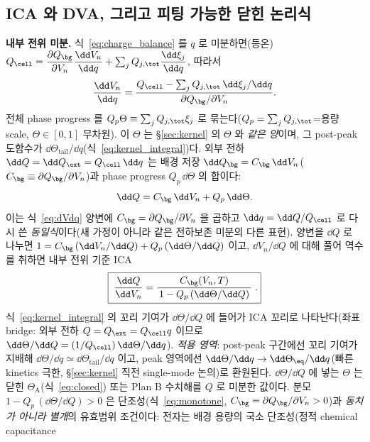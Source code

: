 \subsection{ICA 와 DVA, 그리고 피팅 가능한 닫힌 논리식}\label{sec:fiteq}
\textbf{내부 전위 미분.} 식~\eqref{eq:charge_balance} 를 $q$ 로 미분하면(등온)
$Q_\cell=\dfrac{\partial Q_\bg}{\partial V_n}\dfrac{\dd V_n}{\dd q}+\sum_j Q_{j,\tot}\dfrac{\dd\xi_j}{\dd q}$,
따라서
\begin{equation}
\frac{\dd V_n}{\dd q}=\frac{Q_\cell-\sum_j Q_{j,\tot}\,\dd\xi_j/\dd q}{\partial Q_\bg/\partial V_n}.
\label{eq:dVdq}
\end{equation}
전체 phase progress 를 $Q_p\Theta\equiv\sum_j Q_{j,\tot}\xi_j$ 로 묶는다($Q_p=\sum_j Q_{j,\tot}$=용량 scale,
$\Theta\in[0,1]$ 무차원). 이 $\Theta$ 는 \S\ref{sec:kernel} 의 $\Theta$ 와 \emph{같은 양}이며, 그 post-peak
도함수가 $\dd\Theta_\mathrm{tail}/\dd q$(식~\eqref{eq:kernel_integral})다. 외부 전하 $\dd Q=\dd Q_\ext=
Q_\cell\,\dd q$ 는 배경 저장 $\dd Q_\bg=C_\bg\,\dd V_n$($C_\bg\equiv\partial Q_\bg/\partial V_n$)과
phase progress $Q_p\,\dd\Theta$ 의 합이다:
\begin{equation}
\dd Q=C_\bg\,\dd V_n+Q_p\,\dd\Theta.
\label{eq:dQsplit}
\end{equation}
이는 식~\eqref{eq:dVdq} 양변에 $C_\bg=\partial Q_\bg/\partial V_n$ 을 곱하고 $\dd q=\dd Q/Q_\cell$ 로 다시 쓴
\emph{동일식}이다(새 가정이 아니라 같은 전하보존 미분의 다른 표현). 양변을 $\dd Q$ 로 나누면 $1=C_\bg\,(\dd V_n/\dd Q)+Q_p\,(\dd\Theta/\dd Q)$ 이고, $\dd V_n/\dd Q$ 에 대해 풀어
역수를 취하면 내부 전위 기준 ICA
\begin{equation}
\boxed{\;\frac{\dd Q}{\dd V_n}=\frac{C_\bg(V_n,T)}{\,1-Q_p\,(\dd\Theta/\dd Q)\,}\;.}
\label{eq:fiteq}
\end{equation}
식~\eqref{eq:kernel_integral} 의 꼬리 기여가 $\dd\Theta/\dd Q$ 에 들어가 ICA 꼬리로 나타난다(좌표 bridge:
외부 전하 $Q=Q_\ext=Q_\cell q$ 이므로 $\dd\Theta/\dd Q=(1/Q_\cell)\,\dd\Theta/\dd q$). \emph{적용 영역}: post-peak
구간에선 꼬리 기여가 지배해 $\dd\Theta/\dd q\simeq\dd\Theta_\mathrm{tail}/\dd q$ 이고, peak 영역에선
$\dd\Theta/\dd q\to\dd\Theta_\eq/\dd q$(빠른 kinetics 극한, \S\ref{sec:kernel} 직전 single-mode 논의)로 환원된다.
$\dd\Theta/\dd Q$ 에 넣는 $\Theta$ 는 닫힌 $\Theta_\mathrm A$(식~\eqref{eq:closed}) 또는 Plan B 수치해를 $Q$ 로
미분한 값이다. 분모
$1-Q_p\,(\dd\Theta/\dd Q)>0$ 은 단조성(식~\eqref{eq:monotone}, $C_\bg=\partial Q_\bg/\partial V_n>0$)과
\emph{동치가 아니라 별개}의 유효범위 조건이다: 전자는 배경 용량의 국소 단조성(정적 chemical capacitance
